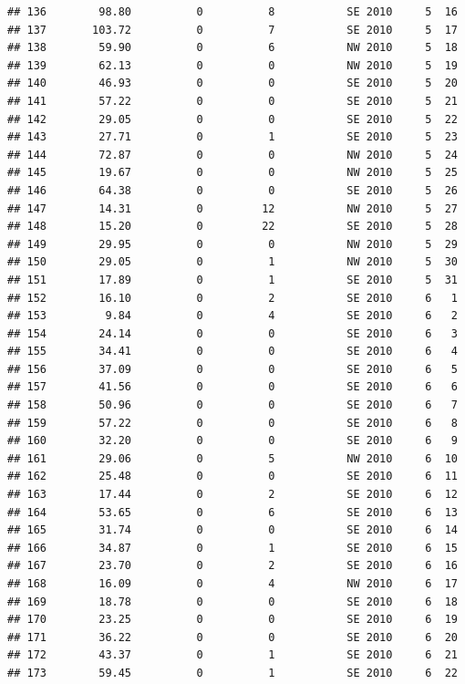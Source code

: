 \documentclass[
]{article}
\begin{document}
\begin{verbatim}
## 136        98.80          0          8           SE 2010     5  16
## 137       103.72          0          7           SE 2010     5  17
## 138        59.90          0          6           NW 2010     5  18
## 139        62.13          0          0           NW 2010     5  19
## 140        46.93          0          0           SE 2010     5  20
## 141        57.22          0          0           SE 2010     5  21
## 142        29.05          0          0           SE 2010     5  22
## 143        27.71          0          1           SE 2010     5  23
## 144        72.87          0          0           NW 2010     5  24
## 145        19.67          0          0           NW 2010     5  25
## 146        64.38          0          0           SE 2010     5  26
## 147        14.31          0         12           NW 2010     5  27
## 148        15.20          0         22           SE 2010     5  28
## 149        29.95          0          0           NW 2010     5  29
## 150        29.05          0          1           NW 2010     5  30
## 151        17.89          0          1           SE 2010     5  31
## 152        16.10          0          2           SE 2010     6   1
## 153         9.84          0          4           SE 2010     6   2
## 154        24.14          0          0           SE 2010     6   3
## 155        34.41          0          0           SE 2010     6   4
## 156        37.09          0          0           SE 2010     6   5
## 157        41.56          0          0           SE 2010     6   6
## 158        50.96          0          0           SE 2010     6   7
## 159        57.22          0          0           SE 2010     6   8
## 160        32.20          0          0           SE 2010     6   9
## 161        29.06          0          5           NW 2010     6  10
## 162        25.48          0          0           SE 2010     6  11
## 163        17.44          0          2           SE 2010     6  12
## 164        53.65          0          6           SE 2010     6  13
## 165        31.74          0          0           SE 2010     6  14
## 166        34.87          0          1           SE 2010     6  15
## 167        23.70          0          2           SE 2010     6  16
## 168        16.09          0          4           NW 2010     6  17
## 169        18.78          0          0           SE 2010     6  18
## 170        23.25          0          0           SE 2010     6  19
## 171        36.22          0          0           SE 2010     6  20
## 172        43.37          0          1           SE 2010     6  21
## 173        59.45          0          1           SE 2010     6  22

\end{verbatim}
\end{document}
